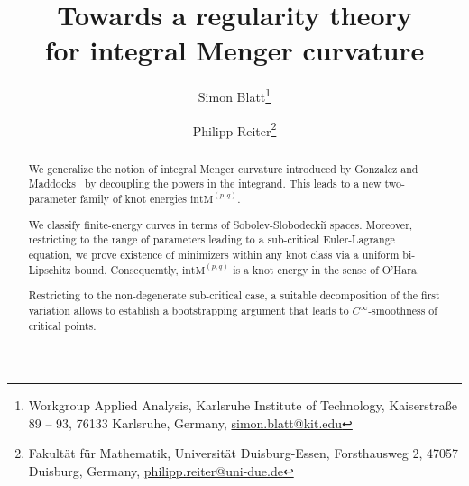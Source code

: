 \documentclass[a4paper,10pt]{article}
\title{Towards a regularity theory \\ for integral Menger curvature}
\author{%
 Simon Blatt\thanks{Workgroup Applied Analysis, Karlsruhe Institute of Technology, Kaiserstra{\ss}e 89 -- 93, 76133 Karlsruhe, Germany, \url{simon.blatt@kit.edu}}
 \and
 Philipp Reiter\thanks{Fakult\"at f\"ur Mathematik, Universit\"at Duisburg-Essen, Forsthausweg 2, 47057 Duisburg, Germany, \url{philipp.reiter@uni-due.de}}}
\theoremstyle{proof}
\theoremstyle{plain}
\numberwithin{equation}{section}
\newcommand{\E}[1][p,q]{\ensuremath{\mathrm{intM}^{(#1)}}}
\newcommand{\R}{\ensuremath{\mathbb{R}}}
\newcommand{\rzd}{\ensuremath{(\R/\Z,\R^n)}}
\newcommand{\W}[1][(3p-2)/q-1,q]{\ensuremath{W^{\scriptstyle #1}}}
\newcommand{\Z}{\ensuremath{\mathbb{Z}}}
\begin{document}
\maketitle
\begin{abstract}
We generalize the notion of
integral Menger curvature introduced by Gonzalez and Maddocks~\cite{gonz-madd} by decoupling 
the powers in the integrand.
This leads to a new two-parameter family
of knot energies $\E$.

We classify finite-energy curves in terms of Sobolev-Slobodecki{\u\i} spaces.
Moreover, restricting to the range
of parameters leading to a sub-critical Euler-Lagrange equation,
we prove existence of minimizers within any knot class via a
uniform bi-Lipschitz bound.
Consequemtly, $\E$ is a knot energy in the sense of O'Hara.

Restricting to the non-degenerate sub-critical case,
a suitable decomposition of the first variation allows to
establish a bootstrapping argument that leads to $C^{\infty}$-smoothness
of critical points.

\end{abstract}
\tableofcontents

\newcommand{\secA}{Classification of finite-energy curves}
\newcommand{\secB}{Existence of minimizers within knot classes}
\newcommand{\secC}{Differentiability}
\newcommand{\secD}{Regularity of stationary points}





\begin{appendix}
 
\end{appendix}

%
%


\end{document}
